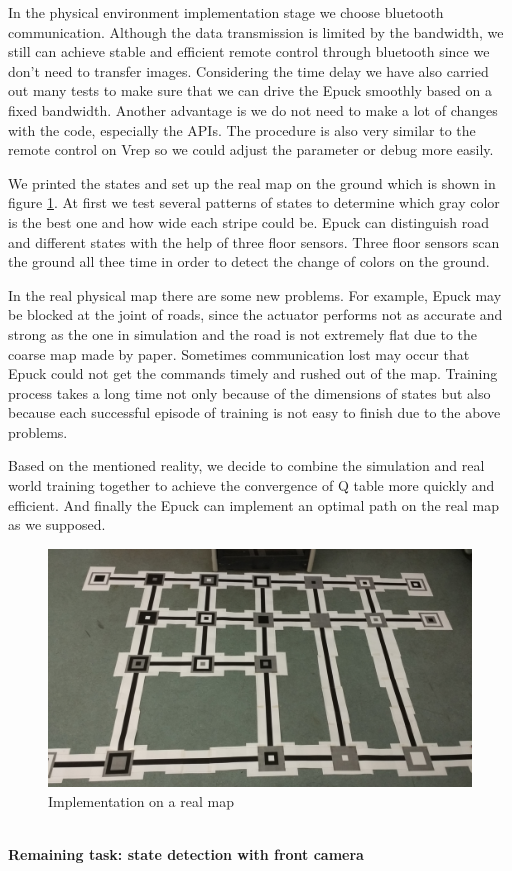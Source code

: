 \documentclass[a4paper, 11pt]{article} %
\begin{document}
In the physical environment implementation stage we choose bluetooth communication. Although the data transmission is limited by the bandwidth, we still can achieve stable and efficient remote control through bluetooth since we don't need to transfer images. Considering the time delay we have also carried out many tests to make sure that we can drive the Epuck smoothly based on a fixed bandwidth. Another advantage is we do not need to make a lot of changes with the code, especially the APIs. The procedure is also very similar to the remote control on Vrep so we could adjust the parameter or debug more easily.

We printed the states and set up the real map on the ground which is shown in figure \ref{fig3}. At first we test several patterns of states to determine which gray color is the best one and how wide each stripe could be. Epuck can distinguish road and different states with the help
of three floor sensors. Three floor sensors scan the ground all thee time in order to
detect the change of colors on the ground.

In the real physical map there are some new problems. For example, Epuck may be blocked at the joint of roads, since the actuator performs not as accurate and strong as the one in simulation and the road is not extremely flat due to the coarse map made by paper. Sometimes communication lost may occur that Epuck could not get the commands timely and rushed out of the map. Training process takes a long time not only because of the dimensions of states but also because each successful episode of training is not easy to finish due to the above problems.

Based on the mentioned reality, we decide to combine the simulation and real world training together to achieve the convergence of Q table more quickly and efficient. And finally the Epuck can implement an optimal path on the real map as we supposed.
\begin{figure}[tb]
\centering 
\includegraphics[width=0.95\columnwidth]{RealMap} 
\caption[An example of a floating figure]{Implementation on a real map} %
\label{fig3} 
\end{figure}
\\[3ex]
\textbf{Remaining task: state detection with front camera}
\end{document}
